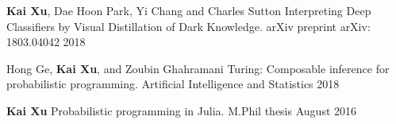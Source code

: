 


\begin{cvpublications}

  \cvpublication
    {\textbf{Kai Xu}, Dae Hoon Park, Yi Chang and Charles Sutton} %
    {Interpreting Deep Classifiers by Visual Distillation of Dark Knowledge.} %
    {arXiv preprint arXiv: 1803.04042} %
    {2018} %

  \cvpublication
    {Hong Ge, \textbf{Kai Xu}, and Zoubin Ghahramani} %
    {Turing: Composable inference for probabilistic programming.} %
    {Artificial Intelligence and Statistics} %
    {2018} %

  \cvpublication
    {\textbf{Kai Xu}} %
    {Probabilistic programming in Julia.} %
    {M.Phil thesis} %
    {August 2016} %

\end{cvpublications}

